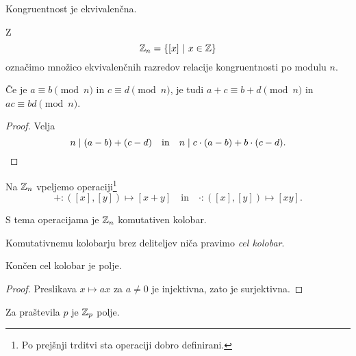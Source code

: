\begin{trditev}
Kongruentnost je ekvivalenčna.
\end{trditev}

\obvs

\begin{definicija}
Z
\[
\mathbb{Z}_n = \left\{[x]~\middle\vert~x \in \mathbb{Z}\right\}
\]
označimo množico ekvivalenčnih razredov relacije kongruentnosti
po modulu $n$.
\end{definicija}

\begin{trditev}
Če je $a \equiv b \pmod{n}$ in $c \equiv d \pmod{n}$, je tudi
$a + c \equiv b + d \pmod{n}$ in $ac \equiv bd \pmod{n}$.
\end{trditev}

\begin{proof}
Velja
\[
n \mid (a - b) + (c - d)
\quad \text{in} \quad
n \mid c \cdot (a - b) + b \cdot (c - d). \qedhere
\]
\end{proof}

\begin{definicija}
Na $\mathbb{Z}_n$ vpeljemo operaciji\footnote{Po prejšnji trditvi sta
operaciji dobro definirani.}
\[
+ \colon ([x],[y]) \mapsto [x+y]
\quad \text{in} \quad
\cdot \colon ([x],[y]) \mapsto [xy].
\]
\end{definicija}

\begin{opomba}
S tema operacijama je $\mathbb{Z}_n$ komutativen kolobar.
\end{opomba}

\begin{definicija}
Komutativnemu kolobarju brez deliteljev niča pravimo
\emph{cel kolobar}.
\end{definicija}

\begin{lema}
Končen cel kolobar je polje.
\end{lema}

\begin{proof}
Preslikava $x \mapsto ax$ za $a \ne 0$ je injektivna, zato je
surjektivna.
\end{proof}

\begin{posledica}
Za praštevila $p$ je $\mathbb{Z}_p$ polje.
\end{posledica}



